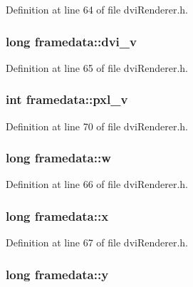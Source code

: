 Definition at line 64 of file dvi\+Renderer.\+h.

\hypertarget{structframedata_a9497085c5712ee20cc25eaa37ea902b6}{
\subsubsection[{dvi\+\_\+v}]{\setlength{\rightskip}{0pt plus 5cm}long framedata\+::dvi\+\_\+v}}\label{structframedata_a9497085c5712ee20cc25eaa37ea902b6}


Definition at line 65 of file dvi\+Renderer.\+h.

\hypertarget{structframedata_a0e7316fa88b0240baa7ce526650131a9}{
\subsubsection[{pxl\+\_\+v}]{\setlength{\rightskip}{0pt plus 5cm}int framedata\+::pxl\+\_\+v}}\label{structframedata_a0e7316fa88b0240baa7ce526650131a9}


Definition at line 70 of file dvi\+Renderer.\+h.

\hypertarget{structframedata_a41ba8896ec8b4ea0765b13c36fd9d18e}{
\subsubsection[{w}]{\setlength{\rightskip}{0pt plus 5cm}long framedata\+::w}}\label{structframedata_a41ba8896ec8b4ea0765b13c36fd9d18e}


Definition at line 66 of file dvi\+Renderer.\+h.

\hypertarget{structframedata_a487a6e23e33001a732d8ed5c6f245f1d}{
\subsubsection[{x}]{\setlength{\rightskip}{0pt plus 5cm}long framedata\+::x}}\label{structframedata_a487a6e23e33001a732d8ed5c6f245f1d}


Definition at line 67 of file dvi\+Renderer.\+h.

\hypertarget{structframedata_a383e2dc0b450b26619b86c9025c6ecae}{
\subsubsection[{y}]{\setlength{\rightskip}{0pt plus 5cm}long framedata\+::y}}\label{structframedata_a383e2dc0b450b26619b86c9025c6ecae}


